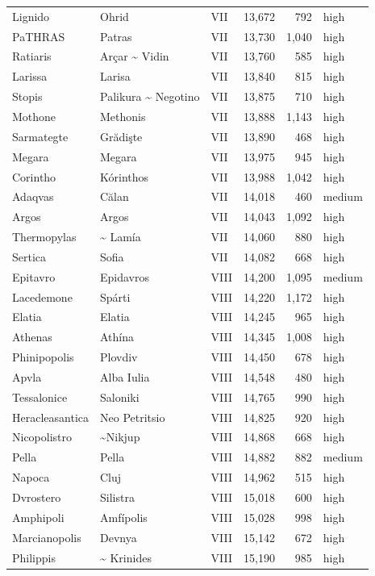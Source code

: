 \documentclass[11pt,a4paper]{article}
\begin{document}
{\begin{longtable}{p{4.6cm}p{5.2cm}lrrl}
Lignido & Ohrid & VII & 13,672 & 792 & high\\
PaTHRAS & Patras & VII & 13,730 & 1,040 & high\\
Ratiaris & Arçar \textasciitilde{} Vidin & VII & 13,760 & 585 & high\\
Larissa & Larisa & VII & 13,840 & 815 & high\\
Stopis & Palikura \textasciitilde{} Negotino & VII & 13,875 & 710 & high\\
Mothone & Methonis & VII & 13,888 & 1,143 & high\\
Sarmategte & Grădişte & VII & 13,890 & 468 & high\\
Megara & Megara & VII & 13,975 & 945 & high\\
Corintho & Kórinthos & VII & 13,988 & 1,042 & high\\
Adaqvas & Călan & VII & 14,018 & 460 & medium\\
Argos & Argos & VII & 14,043 & 1,092 & high\\
Thermopylas & \textasciitilde{} Lamía & VII & 14,060 & 880 & high\\
Sertica & Sofia & VII & 14,082 & 668 & high\\
Epitavro & Epidavros & VIII & 14,200 & 1,095 & medium\\
Lacedemone & Spárti & VIII & 14,220 & 1,172 & high\\
Elatia & Elatia & VIII & 14,245 & 965 & high\\
Athenas & Athína & VIII & 14,345 & 1,008 & high\\
Phinipopolis & Plovdiv & VIII & 14,450 & 678 & high\\
Apvla & Alba Iulia & VIII & 14,548 & 480 & high\\
Tessalonice & Saloniki & VIII & 14,765 & 990 & high\\
Heracleasantica & Neo Petritsio & VIII & 14,825 & 920 & high\\
Nicopolistro & \textasciitilde{}Nikjup & VIII & 14,868 & 668 & high\\
Pella & Pella & VIII & 14,882 & 882 & medium\\
Napoca & Cluj & VIII & 14,962 & 515 & high\\
Dvrostero & Silistra & VIII & 15,018 & 600 & high\\
Amphipoli & Amfípolis & VIII & 15,028 & 998 & high\\
Marcianopolis & Devnya & VIII & 15,142 & 672 & high\\
Philippis & \textasciitilde{} Krinides & VIII & 15,190 & 985 & high\\

\end{longtable}}
\end{document}
